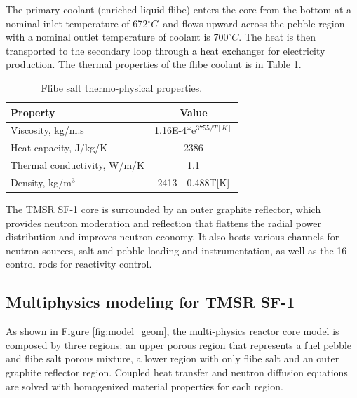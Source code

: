 \documentclass{elsarticle}
\newcommand{\degc}{{\ensuremath{^{\circ}C}}}
\begin{document}
The primary coolant (enriched liquid flibe) enters the core from the bottom at a nominal inlet temperature of 672\degc\ and flows upward across the pebble region with a nominal outlet temperature of coolant is 700\degc. The heat is then transported to the secondary loop through a heat exchanger for electricity production. The thermal properties of the flibe coolant is in Table \ref{tab:flibe}. 

\begin{table}
  \caption{Flibe salt thermo-physical properties.}
  \centering
  \begin{tabular}{lc}
    \hline
    Property & Value\\
    \hline
    Viscosity, kg/m.s & 1.16E-4*e$^{3755/T[K]}$\\
    Heat capacity, J/kg/K & 2386\\
    Thermal conductivity, W/m/K & 1.1\\
    Density, kg/m$^3$ & 2413 - 0.488T[K]\\
    \hline
  \end{tabular}
\label{tab:flibe}
\end{table}

The TMSR SF-1 core is surrounded by an outer graphite reflector, which provides neutron moderation and reflection that flattens the radial power distribution and improves neutron economy. It also hosts various channels for neutron sources, salt and pebble loading and instrumentation, as well as the 16 control rods for reactivity control.


\subsection{Multiphysics modeling for TMSR SF-1}

As shown in Figure \ref{fig:model_geom}, the multi-physics reactor core model is composed by three regions: an upper porous region that represents a fuel pebble and flibe salt porous mixture, a lower region with only flibe salt and an outer graphite reflector region. Coupled heat transfer and neutron diffusion equations are solved with homogenized material properties for each region. 
\end{document}
